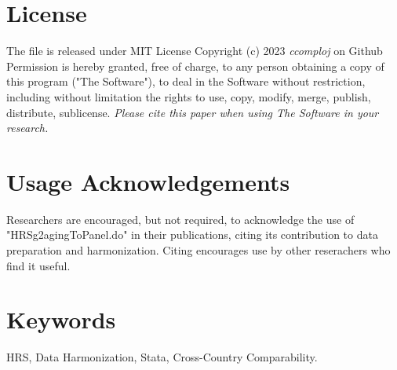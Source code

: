 \documentclass{article}
\begin{document}
\section{License}
The file is released under MIT License Copyright (c) 2023 \textit{ccomploj} on Github Permission is hereby granted, free of charge, to any person obtaining a copy of this program ("The Software"), to deal in the Software without restriction, including without limitation the rights to use, copy, modify, merge, publish, distribute, sublicense. \textit{Please cite this paper when using The Software in your research.}



\section{Usage Acknowledgements}
Researchers are encouraged, but not required, to acknowledge the use of "HRSg2agingToPanel.do" in their publications, citing its contribution to data preparation and harmonization. Citing encourages use by other reserachers who find it useful.


\section{Keywords}
HRS, Data Harmonization, Stata, Cross-Country Comparability.
\end{document}
